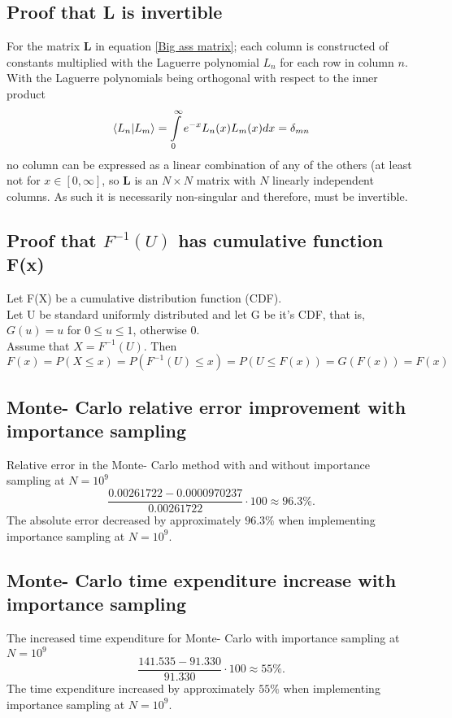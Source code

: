 \documentclass[10pt,a4paper]{article}
\begin{document}
\subsection{Proof that \textbf{L} is invertible}\label{Proof that big ass matrix is invertible}
For the matrix $\textbf{L}$ in equation \ref{Big ass matrix}; each column is constructed of constants multiplied with the Laguerre polynomial $L_n$ for each row in column $n$. With the Laguerre polynomials being orthogonal with respect to the inner product
\begin{equation}
\braket{L_n|L_m} = \int\limits_0^\infty  e^{-x} L_n(x) L_m(x) dx = \delta_{mn}
\end{equation}
no column can be expressed as a linear combination of any of the others (at least not for $x \in [0,\infty]$, so \textbf{L} is an $N\times N$ matrix with $N$ linearly independent columns. As such it is necessarily non-singular and therefore, must be invertible.
\subsection{Proof that $F^{-1}(U)$ has cumulative function F(x)}
Let F(X) be a cumulative distribution function (CDF).\\
Let U be standard uniformly distributed and let G be it's CDF, that is, $G(u)=u$ for $0\leq u\leq 1$, otherwise 0.\\
Assume that $X=F^{-1}(U)$. Then
$$F(x)=P(X\leq x)=P(F^{-1}(U)\leq x)=P(U\leq F(x))=G(F(x))=F(x) 
$$ 
\subsection{Monte- Carlo relative error improvement with importance sampling}\label{Monte- Carlo relative error improvement}
Relative error in the Monte- Carlo method with and without importance sampling at $N = 10^9$
$$
\frac{0.00261722-0.0000970237}{0.00261722}\cdot 100 \approx 96.3\%.
$$
The absolute error decreased by approximately $96.3\%$ when implementing importance sampling at $N = 10^9$.
\subsection{Monte- Carlo time expenditure increase with importance sampling}\label{Monte- Carlo time increase}
The increased time expenditure for Monte- Carlo with importance sampling at $N = 10^9$
$$
\frac{141.535-91.330}{91.330}\cdot 100 \approx 55\%.
$$
The time expenditure increased by approximately $55\%$ when implementing importance sampling at $N = 10^9$.
\end{document}
